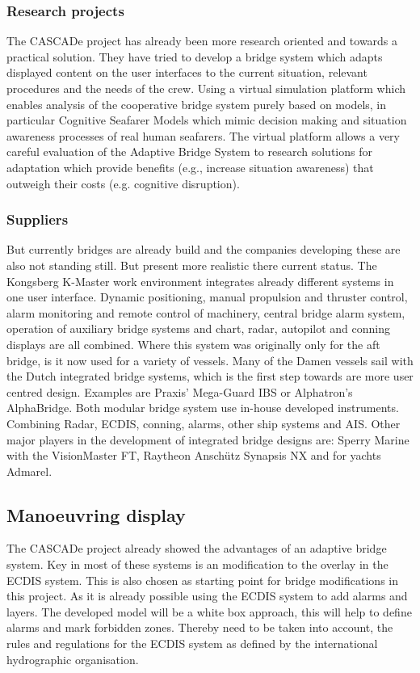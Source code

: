 \subsubsection{Research projects}
The CASCADe project has already been more research oriented and towards a practical solution. They have tried to develop a bridge system which adapts displayed content on the user interfaces to the current situation, relevant procedures and the needs of the crew. Using a virtual simulation platform which enables analysis of the cooperative bridge system purely based on models, in particular Cognitive Seafarer Models which mimic decision making and situation awareness processes of real human seafarers. The virtual platform allows a very careful evaluation of the Adaptive Bridge System to research solutions for adaptation which provide benefits (e.g., increase situation awareness) that outweigh their costs (e.g. cognitive disruption).\cite{CASCADe2015}  

\subsubsection{Suppliers}
But currently bridges are already build and the companies developing these are also not standing still. But present more realistic there current status. The Kongsberg K-Master work environment integrates already different systems in one user interface. Dynamic positioning, manual propulsion and thruster control, alarm monitoring and remote control of machinery, central bridge alarm system, operation of auxiliary bridge systems and chart, radar, autopilot and conning displays are all combined. Where this system was originally only for the aft bridge, is it now used for a variety of vessels. \cite{Kongsberg2017}
Many of the Damen vessels sail with the Dutch integrated bridge systems, which is the first step towards are more user centred design. Examples are Praxis' Mega-Guard IBS or Alphatron's AlphaBridge. Both modular bridge system use in-house developed instruments. Combining Radar, \ac{ECDIS}, conning, alarms, other ship systems and \ac{AIS}. 
Other major players in the development of integrated bridge designs are: Sperry Marine with the VisionMaster FT, Raytheon Anschütz Synapsis NX and for yachts Admarel.\\

\subsection{Manoeuvring display}
The CASCADe project already showed the advantages of an adaptive bridge system. Key in most of these systems is an modification to the overlay in the \ac{ECDIS} system. This is also chosen as starting point for bridge modifications in this project. As it is already possible using the \ac{ECDIS} system to add alarms and layers. The developed model will be a white box approach, this will help to define alarms and mark forbidden zones. Thereby need to be taken into account, the rules and regulations for the \ac{ECDIS} system as defined by the international hydrographic organisation.

